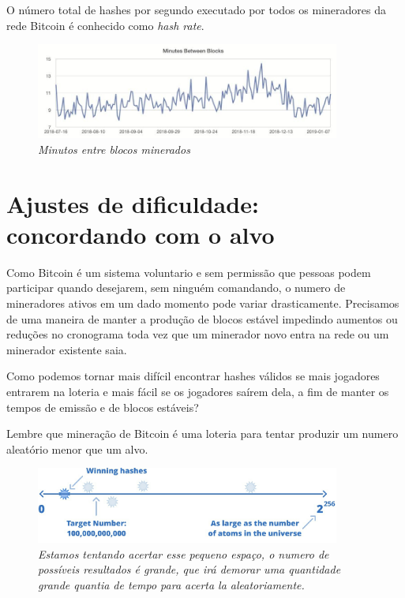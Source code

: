 O número total de hashes por segundo executado por todos os mineradores da rede Bitcoin é conhecido como \textit{hash rate}.

\begin{figure}[htb]
  \centering
  \includegraphics[width=10cm]{imagens/grafico2-capitulo-05.jpg}
  \caption*{\textit{\small Minutos entre blocos minerados}}
\end{figure}




\section*{Ajustes de dificuldade: concordando com o alvo}

Como Bitcoin é um sistema voluntario e sem permissão que pessoas podem participar quando desejarem, sem ninguém comandando, o numero de mineradores ativos em um dado momento pode variar drasticamente. Precisamos de uma maneira de manter a produção de blocos estável impedindo aumentos ou reduções no cronograma toda vez que um minerador novo entra na rede ou um minerador existente saia.


Como podemos tornar mais difícil encontrar hashes válidos se mais jogadores entrarem na loteria e mais fácil se os jogadores saírem dela, a fim de manter os tempos de emissão e de blocos estáveis?

Lembre que mineração de Bitcoin é uma loteria para tentar produzir um numero aleatório menor que um alvo.

\begin{figure}
  \centering
  \includegraphics[width=10cm]{imagens/capitulo5/difficulty1.png}
  \caption*{\textit{\small Estamos tentando acertar esse pequeno espaço, o numero de possíveis resultados é grande, que irá demorar uma quantidade grande quantia de tempo para acerta la aleatoriamente.}}
\end{figure}

